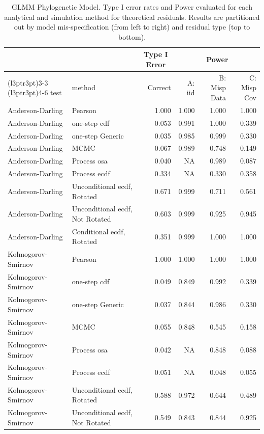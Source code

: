 \documentclass[
]{article}
\begin{document}
\begin{table}[H]
\centering
\caption{\label{tab:phylo-results-glmm-theor}GLMM Phylogenetic Model. Type I error rates and Power evaluated for each analytical and simulation method for theoretical residuals. Results are partitioned out by model mis-specification (from left to right) and residual type (top to bottom).}
\centering
\begin{tabular}[t]{llrrrr}
\toprule
\multicolumn{1}{c}{ } & \multicolumn{1}{c}{ } & \multicolumn{1}{c}{Type I Error} & \multicolumn{3}{c}{Power} \\
\cmidrule(l{3pt}r{3pt}){3-3} \cmidrule(l{3pt}r{3pt}){4-6}
test & method & Correct & A: iid & B: Misp Data & C: Misp Cov\\
\midrule
Anderson-Darling & Pearson & 1.000 & 1.000 & 1.000 & 1.000\\
Anderson-Darling & one-step cdf & 0.053 & 0.991 & 1.000 & 0.339\\
Anderson-Darling & one-step Generic & 0.035 & 0.985 & 0.999 & 0.330\\
Anderson-Darling & MCMC & 0.067 & 0.989 & 0.748 & 0.149\\
Anderson-Darling & Process osa & 0.040 & NA & 0.989 & 0.087\\
\addlinespace
Anderson-Darling & Process ecdf & 0.334 & NA & 0.330 & 0.358\\
Anderson-Darling & Unconditional ecdf, Rotated & 0.671 & 0.999 & 0.711 & 0.561\\
Anderson-Darling & Unconditional ecdf, Not Rotated & 0.603 & 0.999 & 0.925 & 0.945\\
Anderson-Darling & Conditional ecdf, Rotated & 0.351 & 0.999 & 1.000 & 1.000\\
Kolmogorov- Smirnov & Pearson & 1.000 & 1.000 & 1.000 & 1.000\\
\addlinespace
Kolmogorov- Smirnov & one-step cdf & 0.049 & 0.849 & 0.992 & 0.339\\
Kolmogorov- Smirnov & one-step Generic & 0.037 & 0.844 & 0.986 & 0.330\\
Kolmogorov- Smirnov & MCMC & 0.055 & 0.848 & 0.545 & 0.158\\
Kolmogorov- Smirnov & Process osa & 0.042 & NA & 0.848 & 0.088\\
Kolmogorov- Smirnov & Process ecdf & 0.051 & NA & 0.048 & 0.055\\
\addlinespace
Kolmogorov- Smirnov & Unconditional ecdf, Rotated & 0.588 & 0.972 & 0.644 & 0.489\\
Kolmogorov- Smirnov & Unconditional ecdf, Not Rotated & 0.549 & 0.843 & 0.844 & 0.925\\

\end{tabular}
\end{table}
\end{document}
